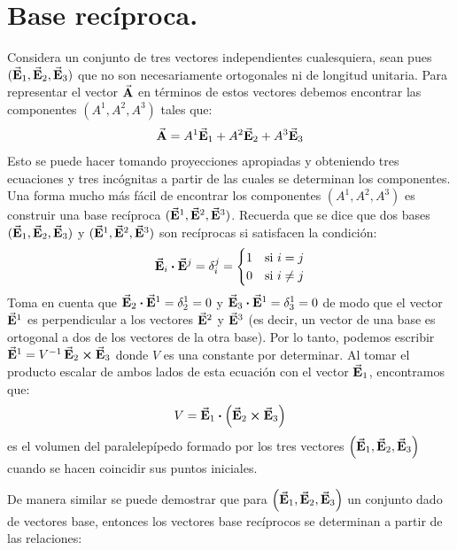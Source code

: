 \documentclass[hidelinks,12pt]{article}
\begin{document}
\section{Base recíproca.}

Considera un conjunto de tres vectores independientes cualesquiera, sean pues $(\va{E}_{1}, \va{E}_{2}, \va{E}_{3})$ que no son necesariamente ortogonales ni de longitud unitaria. Para representar el vector $\va{A}$ en términos de estos vectores debemos encontrar las componentes $\left( A^{1}, A^{2}, A^{3} \right)$ tales que:
\begin{align*}
\va{A} = A^{1} \va{E}_{1} + A^{2} \va{E}_{2} + A^{3} \va{E}_{3}
\end{align*}
Esto se puede hacer tomando proyecciones apropiadas y obteniendo tres ecuaciones y tres incógnitas a partir de las cuales se determinan los componentes. Una forma mucho más fácil de encontrar los componentes $(A^{1}, A^{2}, A^{3})$ es construir una base recíproca $(\va{E}^{1}, \va{E}^{2}, \va{E}^{3})$. Recuerda que se dice que dos bases $(\va{E}_{1}, \va{E}_{2}, \va{E}_{3})$ y $(\va{E}^{1}, \va{E}^{2}, \va{E}^{3})$ son recíprocas si satisfacen la condición:
\begin{align*}
\va{E}_{i} \vdot \va{E}^{j} = \delta_{i}^{j} = \begin{cases}
1 & \mbox{si } i = j \\
0 & \mbox{si } i \neq j
\end{cases}
\end{align*}
Toma en cuenta que $\va{E}_{2} \vdot \va{E}^{1} = \delta_{2}^{1} = 0$ y $\va{E}_{3} \vdot \va{E}^{1} = \delta_{3}^{1} = 0$ de modo que el vector $\va{E}^{1}$ es perpendicular a los vectores $\va{E}^{2}$ y $\va{E}^{3}$ (es decir, un vector de una base es ortogonal a dos de los vectores de la otra base). Por lo tanto, podemos escribir $\va{E}^{1} = V^{-1} \, \va{E}_{2} \cross \va{E}_{3}$ donde $V$ es una constante por determinar. Al tomar el producto escalar de ambos lados de esta ecuación con el vector $\va{E}_{1}$, encontramos que:
\begin{align*}
V = \va{E}_{1} \vdot \left( \va{E}_{2} \cross \va{E}_{3} \right)
\end{align*}
es el volumen del paralelepípedo formado por los tres vectores $\left( \va{E}_{1}, \va{E}_{2}, \va{E}_{3} \right)$ cuando se hacen coincidir sus puntos iniciales.
\par
De manera similar se puede demostrar que para $\left( \va{E}_{1}, \va{E}_{2}, \va{E}_{3} \right)$ un conjunto dado de vectores base, entonces los vectores base recíprocos se determinan a partir de las relaciones:
\end{document}
